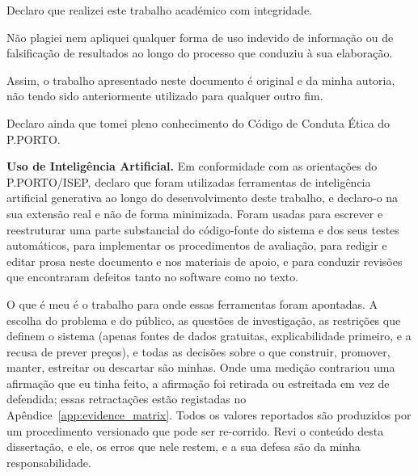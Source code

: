 
\frontmatter %

\pagestyle{plain}


\maketitlepage


\begin{soi}

\vspace{1cm}

Declaro que realizei este trabalho académico com integridade.

Não plagiei nem apliquei qualquer forma de uso indevido de informação ou de falsificação de resultados
ao longo do processo que conduziu à sua elaboração.

Assim, o trabalho apresentado neste documento é original e da minha autoria, não tendo sido anteriormente
utilizado para qualquer outro fim.

Declaro ainda que tomei pleno conhecimento do Código de Conduta Ética do P.PORTO.

\vspace{0.5cm}

\textbf{Uso de Inteligência Artificial.} Em conformidade com as orientações do P.PORTO/ISEP, declaro que
foram utilizadas ferramentas de inteligência artificial generativa ao longo do desenvolvimento deste
trabalho, e declaro-o na sua extensão real e não de forma minimizada. Foram usadas para escrever e
reestruturar uma parte substancial do código-fonte do sistema e dos seus testes automáticos, para
implementar os procedimentos de avaliação, para redigir e editar prosa neste documento e nos materiais
de apoio, e para conduzir revisões que encontraram defeitos tanto no software como no texto.

O que é meu é o trabalho para onde essas ferramentas foram apontadas. A escolha do problema e do
público, as questões de investigação, as restrições que definem o sistema (apenas fontes de dados
gratuitas, explicabilidade primeiro, e a recusa de prever preços), e todas as decisões sobre o que
construir, promover, manter, estreitar ou descartar são minhas. Onde uma medição contrariou uma
afirmação que eu tinha feito, a afirmação foi retirada ou estreitada em vez de defendida; essas
retractações estão registadas no Apêndice~\ref{app:evidence_matrix}. Todos os valores reportados são
produzidos por um procedimento versionado que pode ser re-corrido. Revi o conteúdo desta dissertação, e
ele, os erros que nele restem, e a sua defesa são da minha responsabilidade.


\end{soi}
